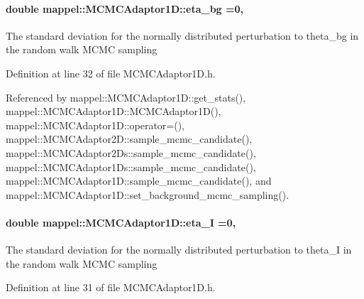 \paragraph[{\texorpdfstring{eta\+\_\+bg}{eta_bg}}]{\setlength{\rightskip}{0pt plus 5cm}double mappel\+::\+M\+C\+M\+C\+Adaptor1\+D\+::eta\+\_\+bg =0\hspace{0.3cm}{\ttfamily [protected]}, {\ttfamily [inherited]}}\hypertarget{classmappel_1_1MCMCAdaptor1D_af54c93421b8e298289cbb92743c6b3d5}{}\label{classmappel_1_1MCMCAdaptor1D_af54c93421b8e298289cbb92743c6b3d5}
The standard deviation for the normally distributed perturbation to theta\+\_\+bg in the random walk M\+C\+MC sampling 

Definition at line 32 of file M\+C\+M\+C\+Adaptor1\+D.\+h.



Referenced by mappel\+::\+M\+C\+M\+C\+Adaptor1\+D\+::get\+\_\+stats(), mappel\+::\+M\+C\+M\+C\+Adaptor1\+D\+::\+M\+C\+M\+C\+Adaptor1\+D(), mappel\+::\+M\+C\+M\+C\+Adaptor1\+D\+::operator=(), mappel\+::\+M\+C\+M\+C\+Adaptor2\+D\+::sample\+\_\+mcmc\+\_\+candidate(), mappel\+::\+M\+C\+M\+C\+Adaptor2\+Ds\+::sample\+\_\+mcmc\+\_\+candidate(), mappel\+::\+M\+C\+M\+C\+Adaptor1\+Ds\+::sample\+\_\+mcmc\+\_\+candidate(), mappel\+::\+M\+C\+M\+C\+Adaptor1\+D\+::sample\+\_\+mcmc\+\_\+candidate(), and mappel\+::\+M\+C\+M\+C\+Adaptor1\+D\+::set\+\_\+background\+\_\+mcmc\+\_\+sampling().

\paragraph[{\texorpdfstring{eta\+\_\+I}{eta_I}}]{\setlength{\rightskip}{0pt plus 5cm}double mappel\+::\+M\+C\+M\+C\+Adaptor1\+D\+::eta\+\_\+I =0\hspace{0.3cm}{\ttfamily [protected]}, {\ttfamily [inherited]}}\hypertarget{classmappel_1_1MCMCAdaptor1D_a5780d326be0c40e10d6c91777cfffbd3}{}\label{classmappel_1_1MCMCAdaptor1D_a5780d326be0c40e10d6c91777cfffbd3}
The standard deviation for the normally distributed perturbation to theta\+\_\+I in the random walk M\+C\+MC sampling 

Definition at line 31 of file M\+C\+M\+C\+Adaptor1\+D.\+h.



